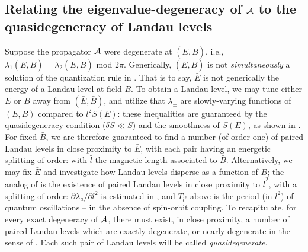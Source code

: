 \documentclass[aps, prb, showpacs, twocolumn, notitlepage, superscriptaddress]{revtex4-1}
\begin{document}

\subsection{Relating the eigenvalue-degeneracy of ${\cal A}$ to the quasidegeneracy of Landau levels}\label{sec:relatedegeneracies}

Suppose the propagator ${\cal A}$ were degenerate at $(\bar{E},\bar{B})$, i.e., $\lambda_1(\bar{E},\bar{B})=\lambda_2(\bar{E},\bar{B})$ mod $2\pi$. Generically, $(\bar{E},\bar{B})$ is not \emph{simultaneously} a solution of the quantization rule in . That is to say, $\bar{E}$ is not generically the energy of a Landau level at field $\bar{B}$. To obtain a Landau level, we may tune either $E$ or $B$   away from $(\bar{E},\bar{B})$, and  utilize that  $\lambda_{\pm}$ are slowly-varying functions of $(E,B)$ compared to $l^2S(E)$:
these inequalities are guaranteed by the quasidegeneracy condition ($\delta S{\ll}S$) and the smoothness of $S(E)$, as shown in .  For fixed $\bar{B}$, we are therefore guaranteed to find a number (of order one) of paired Landau levels  in close proximity to $\bar{E}$, with each pair having an energetic splitting of order:
with $\bar{l}$ the magnetic length associated to $\bar{B}$. Alternatively, we may fix $\bar{E}$ and investigate how Landau levels disperse as a function of $B$; the analog of   is the existence of paired Landau levels in close proximity to $\bar{l}^2$, with a splitting of order:
$\partial \lambda_a/\partial l^2$ is estimated in , and
$T_{l^2}$ above is the period (in $l^2$) of quantum oscillations -- in the absence of spin-orbit coupling. To recapitulate, for every exact degeneracy of ${\cal A}$, there must exist, in close proximity, a number of paired Landau levels which are exactly degenerate, or nearly degenerate in the sense of . Each such pair of Landau levels will be called \textit{quasidegenerate}.
\end{document}
